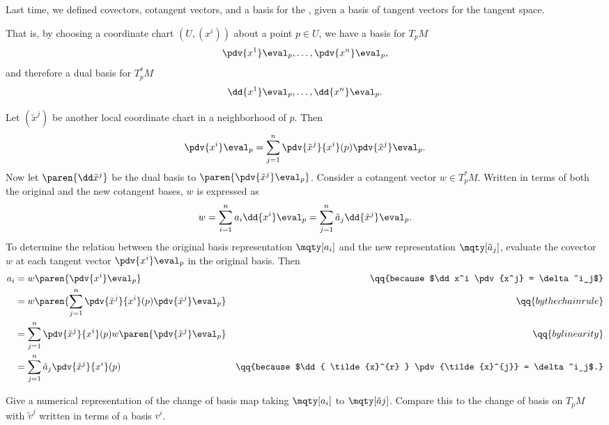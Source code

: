 Last time, we defined covectors, cotangent vectors, and a basis for the , given a basis of tangent vectors for the tangent space.

That is, by choosing a coordinate chart $(U, (x^{i}))$ about a point $p \in U$, we have a basis for $T_p M$
\[
    \pdv{x^1} \eval_p,
    \ldots,
    \pdv{x^n} \eval_p,
\]
and therefore a dual basis for $T^*_p M$
\[
    \dd {x^1} \eval_p,
    \ldots,
    \dd {x^n} \eval_p.
\]

\newcommand{\fake}[2]{\tilde{#1}^{#2}} 

\begin{ex}
   \label{changingcotangent}
    Let $(\fake x j)$ be another local coordinate chart in a neighborhood of $p$. Then
    \[
        \pdv{x^i} \eval_p = \sum^{n}_{j=1} \pdv{\fake x j}{x^i}(p) \pdv{\fake x j} \eval_p.
    \]
    Now let $\paren{ \dd \fake x j }$ be the dual basis to $\paren{ \pdv{\fake x j} \eval_p }$. Consider a cotangent vector $w \in T^*_pM$. Written in terms of both the original and the new cotangent bases, $w$ is expressed as
    \begin{equation*}
       w = \sum^{n}_{i=1} a_i \dd { x^i } \eval_p = \sum^{n}_{j=1} \tilde a_j \dd { \fake x j } \eval_p.
    \end{equation*}
    To determine the relation between the original basis representation $\mqty[a_i]$ and the new representation $\mqty[\tilde a_j]$, evaluate the covector $w$ at each tangent vector $\pdv{x^i} \eval_p$ in the original basis. Then
    \begin{align*}
       a_i &= w\paren{ \pdv{x^i} \eval_p} & \qq{because $\dd x^i \pdv{x^j} = \delta^i_j$} \\
           &= w \paren{ \sum^{n}_{j=1} \pdv{\fake x j}{x^i}(p) \pdv{\fake x j} \eval_p } & \qq{by the chain rule}\\
           &=  \sum^{n}_{j=1} \pdv{\fake x j}{x^i}(p) w \paren{ \pdv{\fake x j} \eval_p } & \qq{by linearity}\\
           &= \sum^{n}_{j=1} \tilde a_j \pdv{\fake x j}{x^i}(p) & \qq{because $\dd { \fake x r } \pdv{\fake x j} = \delta^i_j$.} \\    \end{align*}
\end{ex}

\begin{todo}[]
   Give a numerical representation of the change of basis map taking $\mqty[a_i]$ to $\mqty[\tilde a j]$. Compare this to the change of basis on $T_pM$ with $\fake v j$  written in terms of a basis $v^i$.
\end{todo}

